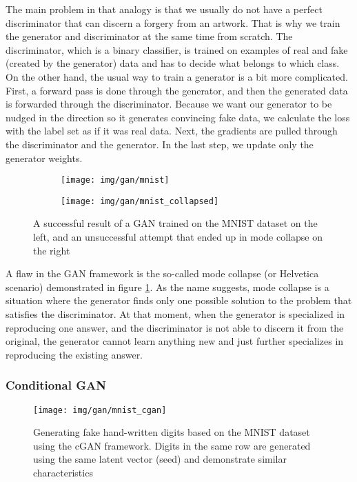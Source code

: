 The main problem in that analogy is that we usually do not have a perfect 
discriminator that can discern a forgery from an artwork. That is why 
we train the generator and discriminator at the same time from scratch. The 
discriminator, which is a binary classifier, is trained on examples of real 
and fake (created by the generator) data and has to decide what belongs 
to which class. On the other hand, the usual way to train a generator is a bit
more complicated. First, a forward pass is done through the generator, and then 
the generated data is forwarded through the discriminator. Because we want our 
generator to be nudged in the direction so it generates convincing fake data, we
calculate the loss with the label set as if it was real data. Next, the gradients are
pulled through the discriminator and the generator. In the last step, we update
only the generator weights.

\begin{figure}[!ht]
	\centering
	\begin{subfigure}{.49\textwidth}
		\centering
		\texttt{[image: img/gan/mnist]}
	\end{subfigure}
	\begin{subfigure}{.49\textwidth}
		\centering
		\texttt{[image: img/gan/mnist\_collapsed]}
	\end{subfigure}
    \caption{A successful result of a GAN trained on the MNIST dataset on the left, 
	and an unsuccessful attempt that ended up in mode collapse on the right}
	\label{fig:gan_mnist}
\end{figure}

A flaw in the GAN framework is the so-called mode collapse (or Helvetica scenario) 
demonstrated in figure \ref{fig:gan_mnist}. As the name suggests, mode collapse is 
a situation where the generator finds only one possible solution to the problem 
that satisfies the discriminator. At that moment, when the generator is specialized
in reproducing one answer, and the discriminator is not able to discern it from 
the original, the generator cannot learn anything new and just further specializes
in reproducing the existing answer.

\subsubsection{Conditional GAN}

\begin{figure}[!ht]
	\centering
	\texttt{[image: img/gan/mnist\_cgan]}
    \caption{Generating fake hand-written digits based on the MNIST dataset 
	using the cGAN framework. Digits in the same row are generated using 
	the same latent vector (seed) and demonstrate similar characteristics}
	\label{fig:cgan_mnist}
\end{figure}


